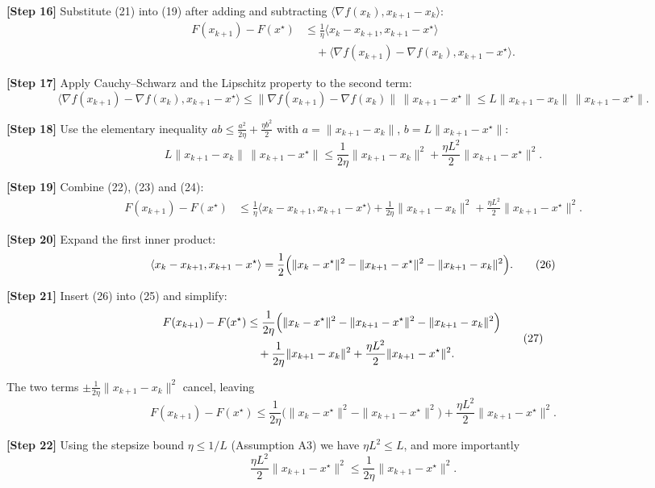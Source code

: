 \documentclass{article}
\begin{document}
\noindent\textbf{[Step 16]} Substitute (21) into (19) after adding and subtracting $\langle \nabla f(x_k),x_{k+1}-x_k\rangle$:
\[
\begin{aligned}
F(x_{k+1})-F(x^\star)
&\le \frac{1}{\eta}\langle x_k-x_{k+1},x_{k+1}-x^\star\rangle \\
&\quad +\langle \nabla f(x_{k+1})-\nabla f(x_k),x_{k+1}-x^\star\rangle .
\end{aligned}
\tag{22}
\]

\noindent\textbf{[Step 17]} Apply Cauchy–Schwarz and the Lipschitz property to the second term:
\[
\langle \nabla f(x_{k+1})-\nabla f(x_k),x_{k+1}-x^\star\rangle
\le \|\nabla f(x_{k+1})-\nabla f(x_k)\|\,\|x_{k+1}-x^\star\|
\le L\|x_{k+1}-x_k\|\,\|x_{k+1}-x^\star\|.
\tag{23}
\]

\noindent\textbf{[Step 18]} Use the elementary inequality $ab\le\frac{a^2}{2\eta}+ \frac{\eta b^2}{2}$ with $a=\|x_{k+1}-x_k\|$, $b=L\|x_{k+1}-x^\star\|$:
\[
L\|x_{k+1}-x_k\|\,\|x_{k+1}-x^\star\|
\le \frac{1}{2\eta}\|x_{k+1}-x_k\|^2+\frac{\eta L^{2}}{2}\|x_{k+1}-x^\star\|^2 .
\tag{24}
\]

\noindent\textbf{[Step 19]} Combine (22), (23) and (24):
\[
\begin{aligned}
F(x_{k+1})-F(x^\star)
&\le \frac{1}{\eta}\langle x_k-x_{k+1},x_{k+1}-x^\star\rangle
+\frac{1}{2\eta}\|x_{k+1}-x_k\|^2
+\frac{\eta L^{2}}{2}\|x_{k+1}-x^\star\|^2 .
\end{aligned}
\tag{25}
\]

\noindent\textbf{[Step 20]} Expand the first inner product:
\[
\langle x_k-x_{k+1},x_{k+1}-x^\star\rangle
= \frac{1}{2}\Bigl(\|x_k-x^\star\|^2-\|x_{k+1}-x^\star\|^2-\|x_{k+1}-x_k\|^2\Bigr).
\tag{26}
\]

\noindent\textbf{[Step 21]} Insert (26) into (25) and simplify:
\[
\begin{aligned}
F(x_{k+1})-F(x^\star)
&\le \frac{1}{2\eta}\Bigl(\|x_k-x^\star\|^2-\|x_{k+1}-x^\star\|^2-\|x_{k+1}-x_k\|^2\Bigr)\\
&\quad +\frac{1}{2\eta}\|x_{k+1}-x_k\|^2
+\frac{\eta L^{2}}{2}\|x_{k+1}-x^\star\|^2 .
\end{aligned}
\tag{27}
\]

The two terms $\pm\frac{1}{2\eta}\|x_{k+1}-x_k\|^2$ cancel, leaving
\[
F(x_{k+1})-F(x^\star)
\le \frac{1}{2\eta}\bigl(\|x_k-x^\star\|^2-\|x_{k+1}-x^\star\|^2\bigr)
+\frac{\eta L^{2}}{2}\|x_{k+1}-x^\star\|^2 .
\tag{28}
\]

\noindent\textbf{[Step 22]} Using the stepsize bound $\eta\le 1/L$ (Assumption A3) we have $\eta L^{2}\le L$, and more importantly
\[
\frac{\eta L^{2}}{2}\|x_{k+1}-x^\star\|^2\le \frac{1}{2\eta}\|x_{k+1}-x^\star\|^2 .
\tag{29}
\]
\end{document}
